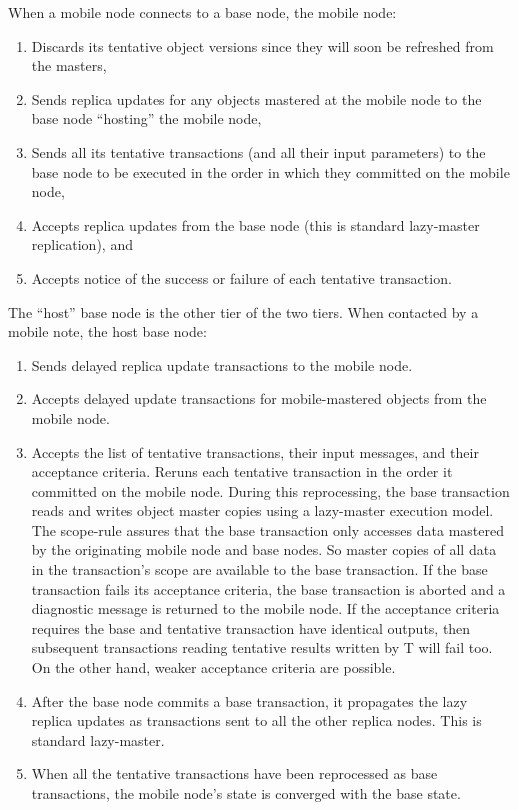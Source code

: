 \documentclass[a4paper,12pt,twoside,openright]{article}
\begin{document}
When a mobile node connects to a base node, the mobile node:

\begin{enumerate}
\def\labelenumi{\arabic{enumi}.}
\item
  Discards its tentative object versions since they will soon be
  refreshed from the masters,
\item
  Sends replica updates for any objects mastered at the mobile node to
  the base node ``hosting'' the mobile node,
\item
  Sends all its tentative transactions (and all their input parameters)
  to the base node to be executed in the order in which they committed
  on the mobile node,
\item
  Accepts replica updates from the base node (this is standard
  lazy-master replication), and
\item
  Accepts notice of the success or failure of each tentative
  transaction.
\end{enumerate}

The ``host'' base node is the other tier of the two tiers. When
contacted by a mobile note, the host base node:

\begin{enumerate}
\def\labelenumi{\arabic{enumi}.}
\item
  Sends delayed replica update transactions to the mobile node.
\item
  Accepts delayed update transactions for mobile-mastered objects from
  the mobile node.
\item
  Accepts the list of tentative transactions, their input messages, and
  their acceptance criteria. Reruns each tentative transaction in the
  order it committed on the mobile node. During this reprocessing, the
  base transaction reads and writes object master copies using a
  lazy-master execution model. The scope-rule assures that the base
  transaction only accesses data mastered by the originating mobile node
  and base nodes. So master copies of all data in the transaction's
  scope are available to the base transaction. If the base transaction
  fails its acceptance criteria, the base transaction is aborted and a
  diagnostic message is returned to the mobile node. If the acceptance
  criteria requires the base and tentative transaction have identical
  outputs, then subsequent transactions reading tentative results
  written by T will fail too. On the other hand, weaker acceptance
  criteria are possible.
\item
  After the base node commits a base transaction, it propagates the lazy
  replica updates as transactions sent to all the other replica nodes.
  This is standard lazy-master.
\item
  When all the tentative transactions have been reprocessed as base
  transactions, the mobile node's state is converged with the base
  state.
\end{enumerate}
\end{document}
